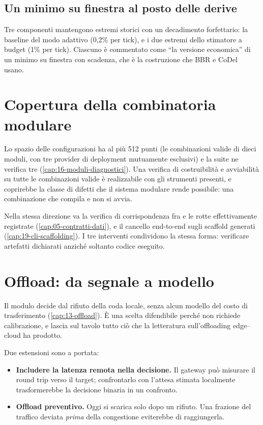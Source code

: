 \subsection{Un minimo su finestra al posto delle derive}

Tre componenti mantengono estremi storici con un decadimento forfettario:
la baseline del modo adattivo (0{,}2\% per tick), e i due estremi dello
stimatore a budget (1\% per tick). Ciascuno \`e commentato come ``la versione
economica'' di un minimo su finestra con scadenza, che \`e la costruzione che
BBR e CoDel~\cite{nichols2012codel} usano.

\section{Copertura della combinatoria modulare}

Lo spazio delle configurazioni ha al pi\`u 512 punti (le combinazioni valide di dieci moduli, con tre provider di deployment mutuamente esclusivi) e la suite ne verifica tre
(\cref{cap:16-moduli-diagnostici}). Una verifica di costruibilit\`a e
avviabilit\`a su tutte le combinazioni valide \`e realizzabile con gli strumenti
presenti, e coprirebbe la classe di difetti che il sistema modulare rende
possibile: una combinazione che compila e non si avvia.

Nella stessa direzione va la verifica di corrispondenza fra  e
le rotte effettivamente registrate (\cref{cap:05-contratti-dati}), e il cancello
end-to-end sugli scaffold generati (\cref{cap:19-cli-scaffolding}). I tre
interventi condividono la stessa forma: verificare artefatti dichiarati anzich\'e
soltanto codice eseguito.

\section{Offload: da segnale a modello}

Il modulo  decide dal rifiuto della coda locale, senza alcun
modello del costo di trasferimento (\cref{cap:13-offload}). \`E una scelta
difendibile perch\'e non richiede calibrazione, e lascia sul tavolo tutto ci\`o
che la letteratura sull'offloading edge--cloud ha prodotto.

Due estensioni sono a portata:

\begin{itemize}[leftmargin=*]
  \item \textbf{Includere la latenza remota nella decisione.} Il gateway pu\`o
  misurare il round trip verso il target; confrontarlo con l'attesa stimata
  localmente trasformerebbe la decisione binaria in un confronto.
  \item \textbf{Offload preventivo.} Oggi si scarica solo dopo un rifiuto. Una
  frazione del traffico deviata \emph{prima} della congestione eviterebbe di
  raggiungerla.
\end{itemize}

